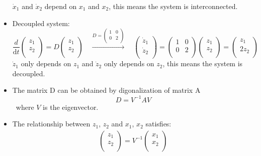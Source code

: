 \begin{ex}{}
\begin{itemize}
$\dot{x}_{1}$ and $\dot{x}_{2}$ depend on $x_{1}$ and $x_{2}$, this means the system is interconnected. 
\item Decoupled system:
\begin{equation*}
\frac{d}{\mathrm{d}t} 
\begin{pmatrix}
z_{1}\\
z_{2}\\
\end{pmatrix}
=D
\begin{pmatrix}
z_{1}\\
z_{2}\\
\end{pmatrix} \quad \xrightarrow{D=\begin{pmatrix}
1 & 0\\
0 & 2\\
\end{pmatrix}} \quad 
\begin{pmatrix}
\dot{z}_{1}\\
\dot{z}_{2}\\
\end{pmatrix} = 
\begin{pmatrix}
1 & 0\\
0 & 2\\
\end{pmatrix}
\begin{pmatrix}
z_{1}\\
z_{2}\\
\end{pmatrix} = \begin{pmatrix}
z_{1}\\
2z_{2}\\
\end{pmatrix}
\end{equation*}
$\dot{z}_{1}$ only depends on $z_{1}$ and $\dot{z}_{2}$ only depends on $z_{2}$, this means the system is decoupled. 
\item The matrix D can be obtained by digonalization of matrix A
\[D =  V^{-1}AV\]
 \ where $V$ is the eigenvector.
\item The relationship between $z_{1}$, $z_{2}$ and $x_{1}$, $x_{2}$ satisfies:
\begin{gather*}
\begin{pmatrix}
z_{1}\\
z_{2}\\
\end{pmatrix}
=V^{-1}
\begin{pmatrix}
x_{1}\\
x_{2}\\

\end{pmatrix}
\end{gather*}
\end{itemize}
\end{ex}
